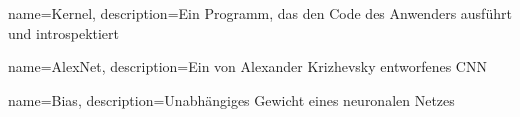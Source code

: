 
%
%

%
%

	{name={Kernel}, 
	description={Ein Programm, das den Code des Anwenders ausführt und introspektiert}
	}
	
	{name={AlexNet}, 
	description={Ein von Alexander Krizhevsky entworfenes \ac{CNN}}
	}

	{name={Bias}, 
	description={Unabhängiges Gewicht eines neuronalen Netzes}
	}


